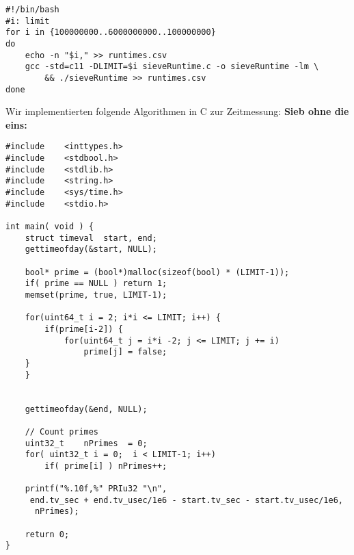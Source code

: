 \documentclass[a4paper,12pt]{article}
\begin{document}
\begin{verbatim}
#!/bin/bash
#i: limit
for i in {100000000..6000000000..100000000}
do
    echo -n "$i," >> runtimes.csv
    gcc -std=c11 -DLIMIT=$i sieveRuntime.c -o sieveRuntime -lm \
		&& ./sieveRuntime >> runtimes.csv
done
\end{verbatim}

\noindent Wir implementierten folgende Algorithmen in C zur Zeitmessung:
\newpage
\noindent \textbf{Sieb ohne die eins:}
\begin{verbatim}
#include    <inttypes.h>
#include    <stdbool.h>
#include    <stdlib.h>
#include    <string.h>
#include    <sys/time.h>
#include    <stdio.h>

int main( void ) {
    struct timeval  start, end;
    gettimeofday(&start, NULL);
    
    bool* prime = (bool*)malloc(sizeof(bool) * (LIMIT-1));
    if( prime == NULL ) return 1;
    memset(prime, true, LIMIT-1);

    for(uint64_t i = 2; i*i <= LIMIT; i++) {
        if(prime[i-2]) {
            for(uint64_t j = i*i -2; j <= LIMIT; j += i)
                prime[j] = false;
	}
    }


    gettimeofday(&end, NULL);
    
    // Count primes
    uint32_t    nPrimes  = 0;
    for( uint32_t i = 0;  i < LIMIT-1; i++)
        if( prime[i] ) nPrimes++;
    
    printf("%.10f,%" PRIu32 "\n", 
	 end.tv_sec + end.tv_usec/1e6 - start.tv_sec - start.tv_usec/1e6, 
	  nPrimes);
    
	return 0;
}
\end{verbatim}
\end{document}

